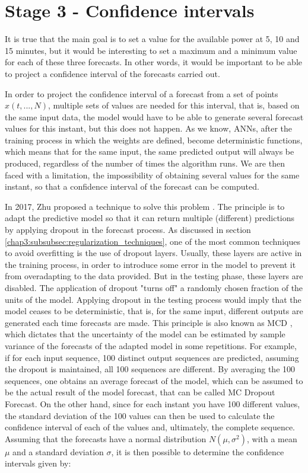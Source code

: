 \newpage
\section{Stage 3 - Confidence intervals}\label{chap3:section:stage_3}

It is true that the main goal is to set a value for the available power at 5, 10 and 15 minutes, but it would be interesting to set a maximum and a minimum value for each of these three forecasts. In other words, it would be important to be able to project a confidence interval of the forecasts carried out. 

In order to project the confidence interval of a forecast from a set of points $x(t, ..., N)$, multiple sets of values are needed for this interval, that is, based on the same input data, the model would have to be able to generate several forecast values for this instant, but this does not happen. As we know, \ac{ANNs}, after the training process in which the weights are defined, become deterministic functions, which means that for the same input, the same predicted output will always be produced, regardless of the number of times the algorithm runs. We are then faced with a limitation, the impossibility of obtaining several values for the same instant, so that a confidence interval of the forecast can be computed.

In 2017, Zhu proposed a technique to solve this problem \cite{uber}. The principle is to adapt the predictive model so that it can return multiple (different) predictions by applying dropout in the forecast process. As discussed in section \ref{chap3:subsubsec:regularization_techniques}, one of the most common techniques to avoid overfitting is the use of dropout layers. Usually, these layers are active in the training process, in order to introduce some error in the model to prevent it from overadapting to the data provided. But in the testing phase, these layers are disabled. The application of dropout "turns off" a randomly chosen fraction of the units of the model. Applying dropout in the testing process would imply that the model ceases to be deterministic, that is, for the same input, different outputs are generated each time forecasts are made. 
This principle is also known as \ac{MCD} \cite{uber2}, which dictates that the uncertainty of the model can be estimated by sample variance of the forecasts of the adapted model in some repetitions. For example, if for each input sequence, 100 distinct output sequences are predicted, assuming the dropout is maintained, all 100 sequences are different. By averaging the 100 sequences, one obtains an average forecast of the model, which can be assumed to be the actual result of the model forecast, that can be called MC Dropout Forecast. On the other hand, since for each instant you have 100 different values, the standard deviation of the 100 values can then be used to calculate the confidence interval of each of the values and, ultimately, the complete sequence. Assuming that the forecasts have a normal distribution $N(\mu, \sigma^2)$, with a mean $\mu$ and a standard deviation $\sigma$, it is then possible to determine the confidence intervals given by: 

